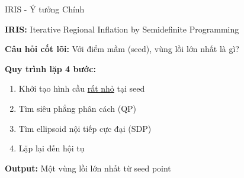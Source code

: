 \documentclass[aspectratio=169]{beamer}
\begin{document}
\begin{frame}{IRIS - Ý tưởng Chính}

    \textbf{IRIS:} Iterative Regional Inflation by Semidefinite Programming
    
    \textbf{Câu hỏi cốt lõi:} Với điểm mầm (seed), vùng lồi lớn nhất là gì?

    \vspace{1em}
    \textbf{Quy trình lặp 4 bước:}
    \begin{enumerate}
        \item Khởi tạo hình cầu \underline{rất nhỏ} tại seed
        \item Tìm siêu phẳng phân cách (QP)
        \item Tìm ellipsoid nội tiếp cực đại (SDP)
        \item Lặp lại đến hội tụ
    \end{enumerate}

    \vspace{0.5em}
    \textbf{Output:} Một vùng lồi lớn nhất từ seed point

\end{frame}
\end{document}
